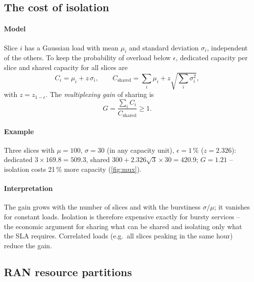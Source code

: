 \documentclass[11pt,a4paper]{article}
\begin{document}
\subsection{The cost of isolation}\label{sec:mux}
\paragraph{Model} Slice $i$ has a Gaussian load with mean $\mu_i$ and standard deviation $\sigma_i$, independent of the others. To keep the
probability of overload below $\epsilon$, dedicated capacity per slice and shared capacity for all slices are
\begin{equation}\label{eq:dedicated}
  C_i = \mu_i + z\,\sigma_i, \qquad
  C_{\mathrm{shared}} = \sum_i \mu_i + z\sqrt{\sum_i \sigma_i^2},
\end{equation}
with $z = z_{1-\epsilon}$. The \emph{multiplexing gain} of sharing is
\begin{equation}\label{eq:gain}
  G = \frac{\sum_i C_i}{C_{\mathrm{shared}}} \ge 1 .
\end{equation}
\paragraph{Example} Three slices with $\mu = 100$, $\sigma = 30$ (in any capacity unit), $\epsilon = 1\,\%$ ($z = 2.326$): dedicated $3\times169.8 =
509.3$, shared $300 + 2.326\sqrt3\times30 = 420.9$; $G = 1.21$ -- isolation costs 21\,\% more capacity (\cref{fig:mux}).
\paragraph{Interpretation} The gain grows with the number of slices and with the burstiness $\sigma/\mu$; it vanishes for constant loads.
Isolation is therefore expensive exactly for bursty services -- the economic argument for sharing what can be shared and isolating only what
the SLA requires. Correlated loads (e.g.\ all slices peaking in the same hour) reduce the gain.

\begin{acnfigure}
  \caption{Multiplexing gain of a shared pool versus dedicated slice capacity (\cref{eq:gain}, $\epsilon = 1\,\%$).}
  \label{fig:mux}
\end{acnfigure}

\subsection{RAN resource partitions}\label{sec:prb}
\end{document}
